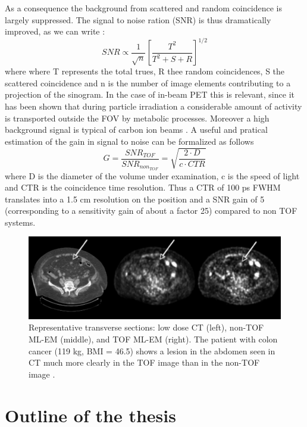 As a consequence the background from scattered and random coincidence is largely suppressed. 
The signal to noise ration (SNR) is thus dramatically improved, as we can write \cite{Karp2008}:
\begin{equation}
SNR \propto \frac{1}{\sqrt{n}}\left[ \frac{T^{2}}{T^{2} + S + R} \right]^{1/2}
\end{equation}
where where T represents the total trues, R thee random coincidences, S the scattered coincidence and n is the number of image elements contributing to a projection of the sinogram.
In the case of in-beam PET this is relevant, since it has been shown \cite{Fiedler2006} that during particle irradiation a considerable amount of activity is transported outside the FOV by metabolic processes. Moreover a high background signal is typical of carbon ion beams \cite{Enghardt2004}. 
A useful and pratical estimation of the gain in signal to noise can be formalized as follows
\begin{equation}
G = \frac{SNR_{TOF}}{SNR_{non_{TOF}}} = \sqrt{\frac{2\cdot D}{c \cdot CTR}}
\end{equation}
where D is the diameter of the volume under examination, c is the speed of light and CTR is the coincidence time resolution. Thus a CTR of 100 ps FWHM translates into a 1.5 cm resolution on the position and a SNR gain of 5 (corresponding to a sensitivity gain of about a factor 25) compared to non TOF systems.

\begin{figure}  
\centering
\includegraphics[width=14cm]{Pictures/Chapter_1/tof_gain.pdf}
\caption[Improvement of TOF-PET]{Representative transverse sections: low dose CT (left), non-TOF ML-EM (middle), and TOF ML-EM (right). The patient with colon cancer (119 kg, BMI = 46.5) shows a lesion in the abdomen seen in CT much more clearly in the TOF image than in the non-TOF image \cite{Karp2008}.}
\label{fig:tofgain}
\end{figure}

\section{Outline of the thesis}


